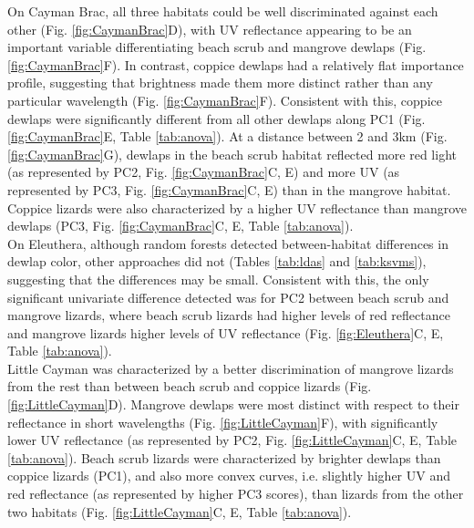 On Cayman Brac, all three habitats could be well discriminated against each other (Fig. \ref{fig:CaymanBrac}D), with UV reflectance appearing to be an important variable differentiating beach scrub and mangrove dewlaps (Fig. \ref{fig:CaymanBrac}F). In contrast, coppice dewlaps had a relatively flat importance profile, suggesting that brightness made them more distinct rather than any particular wavelength (Fig. \ref{fig:CaymanBrac}F). Consistent with this, coppice dewlaps were significantly different from all other dewlaps along PC1 (Fig. \ref{fig:CaymanBrac}E, Table \ref{tab:anova}). At a distance between 2 and 3km (Fig. \ref{fig:CaymanBrac}G), dewlaps in the beach scrub habitat reflected more red light (as represented by PC2, Fig. \ref{fig:CaymanBrac}C, E) and more UV (as represented by PC3, Fig. \ref{fig:CaymanBrac}C, E) than in the mangrove habitat. Coppice lizards were also characterized by a higher UV reflectance than mangrove dewlaps (PC3, Fig. \ref{fig:CaymanBrac}C, E, Table \ref{tab:anova}).\\

On Eleuthera, although random forests detected between-habitat differences in dewlap color, other approaches did not (Tables \ref{tab:ldas} and \ref{tab:ksvms}), suggesting that the differences may be small. Consistent with this, the only significant univariate difference detected was for PC2 between beach scrub and mangrove lizards, where beach scrub lizards had higher levels of red reflectance and mangrove lizards higher levels of UV reflectance (Fig. \ref{fig:Eleuthera}C, E, Table \ref{tab:anova}).\\

Little Cayman was characterized by a better discrimination of mangrove lizards from the rest than between beach scrub and coppice lizards (Fig. \ref{fig:LittleCayman}D). Mangrove dewlaps were most distinct with respect to their reflectance in short wavelengths (Fig. \ref{fig:LittleCayman}F), with significantly lower UV reflectance (as represented by PC2, Fig. \ref{fig:LittleCayman}C, E, Table \ref{tab:anova}). Beach scrub lizards were characterized by brighter dewlaps than coppice lizards (PC1), and also more convex curves, i.e. slightly higher UV and red reflectance (as represented by higher PC3 scores), than lizards from the other two habitats (Fig. \ref{fig:LittleCayman}C, E, Table \ref{tab:anova}).\\

